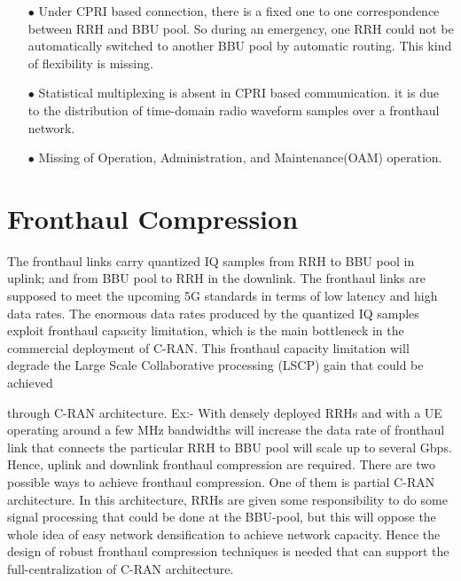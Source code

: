 \begin{multicols}{2}
\begin{itemize}
\begin{itemize}
\item[$\bullet$]  Under CPRI based connection, there is a fixed one to one correspondence between RRH and BBU pool. So during an emergency, one RRH could not be automatically switched to another BBU pool by automatic routing. This kind of flexibility is missing. 

\item[$\bullet$] Statistical multiplexing is absent in CPRI based communication. it is due to the distribution of time-domain radio waveform samples over a fronthaul network.

\item[$\bullet$] Missing of Operation, Administration, and Maintenance(OAM) operation.

\end{itemize}
\end{itemize}

\section{Fronthaul Compression}\label{sect06}

The fronthaul links carry quantized IQ samples from RRH to BBU pool in uplink; and from BBU pool to RRH in the downlink. The fronthaul links are supposed to meet the upcoming 5G standards in terms of low latency and high data rates. The enormous data rates produced by the quantized IQ samples exploit fronthaul capacity limitation, which is the main bottleneck in the commercial deployment of C-RAN. This fronthaul capacity limitation will degrade the Large Scale Collaborative processing (LSCP) gain that could be achieved

through C-RAN architecture. Ex:- With densely deployed RRHs and with a UE operating around a few MHz bandwidths will increase the data rate of fronthaul link that connects the particular RRH to BBU pool will scale up to several Gbps. Hence, uplink and downlink fronthaul compression are required. There are two possible ways to achieve fronthaul compression. One of them is partial C-RAN architecture. In this architecture, RRHs are given some responsibility to do some signal processing that could be done at the BBU-pool, but this will oppose the whole idea of easy network densification to achieve network capacity. Hence the design of robust fronthaul compression techniques is needed that can support the full-centralization of C-RAN architecture.


\end{multicols}
